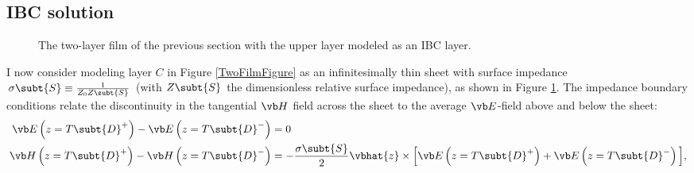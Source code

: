 \documentclass{article}
\begin{document}
\subsection{IBC solution}
\label{FilmIBCSolution}

\begin{figure}[h]
\caption{The two-layer film of the previous section with the 
upper layer modeled as an IBC layer.}
\label{IBCFilmFigure}
\end{figure}
I now consider modeling layer $C$ in Figure \ref{TwoFilmFigure}
as an infinitesimally thin sheet with surface impedance
$\sigma\subt{S}\equiv \frac{1}{Z_0 Z\subt{S}}$
(with $Z\subt{S}$ the dimensionless relative surface impedance),
as shown in Figure \ref{IBCFilmFigure}.
The impedance boundary conditions relate the discontinuity
in the tangential $\vb H$ field across the sheet to the
average $\vb E$-field above and below the sheet:
\begin{align}
\vb E\left(z=T\subt{D}^+\right) - \vb E\left(z=T\subt{D}^-\right)
 &=0
\\
\vb H\left(z=T\subt{D}^+\right) - \vb H\left(z=T\subt{D}^-\right)
 &=-\frac{\sigma\subt{S}}{2}\vbhat{z}\times\Big[
  \vb E\left(z=T\subt{D}^+\right) + \vb E\left(z=T\subt{D}^-\right)\Big],
\end{align}
\end{document}
